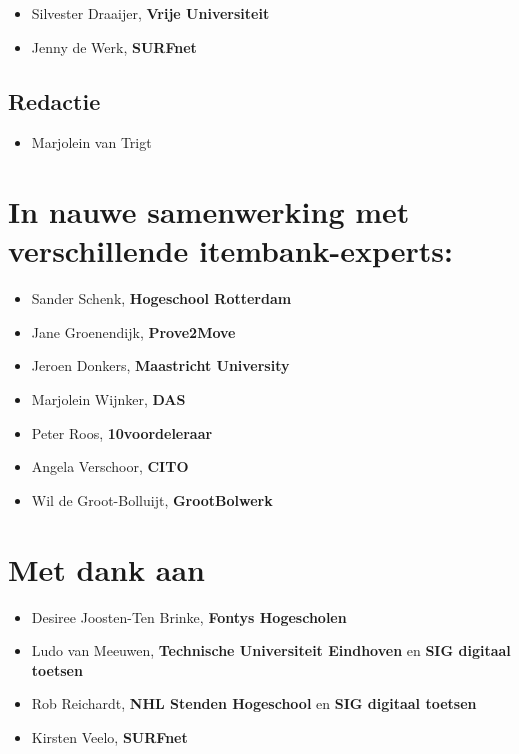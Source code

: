 \documentclass[
]{book}
\providecommand{\tightlist}{%
  \setlength{\itemsep}{0pt}\setlength{\parskip}{0pt}}
\begin{document}
\begin{itemize}
\tightlist
\item
  Silvester Draaijer, \textbf{Vrije Universiteit}
\item
  Jenny de Werk, \textbf{SURFnet}
\end{itemize}

\hypertarget{redactie}{%
\subsection{Redactie}\label{redactie}}

\begin{itemize}
\tightlist
\item
  Marjolein van Trigt
\end{itemize}

\hypertarget{in-nauwe-samenwerking-met-verschillende-itembank-experts}{%
\section{In nauwe samenwerking met verschillende itembank-experts:}\label{in-nauwe-samenwerking-met-verschillende-itembank-experts}}

\begin{itemize}
\tightlist
\item
  Sander Schenk, \textbf{Hogeschool Rotterdam}
\item
  Jane Groenendijk, \textbf{Prove2Move}
\item
  Jeroen Donkers, \textbf{Maastricht University}
\item
  Marjolein Wijnker, \textbf{DAS}
\item
  Peter Roos, \textbf{10voordeleraar}
\item
  Angela Verschoor, \textbf{CITO}
\item
  Wil de Groot-Bolluijt, \textbf{GrootBolwerk}
\end{itemize}

\hypertarget{met-dank-aan}{%
\section{Met dank aan}\label{met-dank-aan}}

\begin{itemize}
\tightlist
\item
  Desiree Joosten-Ten Brinke, \textbf{Fontys Hogescholen}
\item
  Ludo van Meeuwen, \textbf{Technische Universiteit Eindhoven} en \textbf{SIG digitaal toetsen}
\item
  Rob Reichardt, \textbf{NHL Stenden Hogeschool} en \textbf{SIG digitaal toetsen}
\item
  Kirsten Veelo, \textbf{SURFnet}
\end{itemize}
\end{document}
